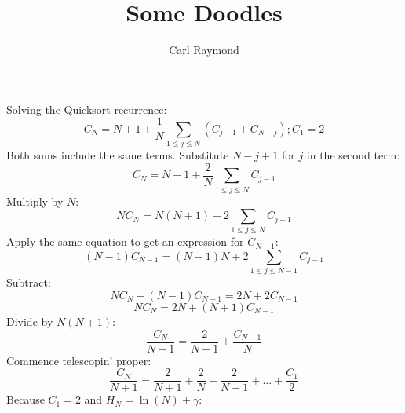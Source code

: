 \documentclass[11pt, oneside]{article}   	%
\title{Some Doodles}
\author{Carl Raymond}
\begin{document}
\maketitle


Solving the Quicksort recurrence:
\[
	C_N = N+1 + \frac{1}{N} \sum_{1 \le j \le N} (C_{j-1} + C_{N-j}) ; C_1 = 2
\]
Both sums include the same terms. Substitute $N-j+1$ for $j$ in the second term:
\[
	C_N = N+1 + \frac{2}{N}\sum_{1 \le j \le N}C_{j-1}
\]
Multiply by $N$:
\[
	N C_N = N(N+1) + 2\sum_{1 \le j \le N} C_{j-1}
\]
Apply the same equation to get an expression for $C_{N-1}$:
\[
	(N-1)C_{N-1} = (N-1)N +2\sum_{1 \le j \le N-1}C_{j-1}
\]
Subtract:
\[
	NC_N - (N-1)C_{N-1} = 2N + 2 C_{N-1}
\]
\[
	NC_N = 2N + (N+1)C_{N-1}
\]
Divide by $N(N+1)$:
\[
	\frac{C_N}{N+1} = \frac{2}{N+1} + \frac{C_{N-1}}{N}
\]
Commence telescopin' proper:
\[
	\frac{C_N}{N+1} = \frac{2}{N+1} + \frac{2}{N} + \frac{2}{N-1} + \dots + \frac{C_1}{2}
\]
Because $C_1=2$ and $H_N = \ln(N)+\gamma$:
\end{document}
